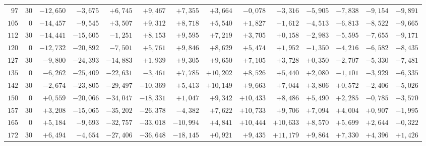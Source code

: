 \begin{landscape}
\begin{longtable}{@{}rr|r|r|r|r|r|r|r|r|r|r|r|r@{}}
\(97\) & \(30\) & \(-12{,}650\) & \(-3{,}675\) & \(+6{,}745\) & \(+9{,}467\) & \(+7{,}355\) & \(+3{,}664\) & \(-0{,}078\) & \(-3{,}316\) & \(-5{,}905\) & \(-7{,}838\) & \(-9{,}154\) & \(-9{,}891\)\\
\(105\) & \(0\) & \(-14{,}457\) & \(-9{,}545\) & \(+3{,}507\) & \(+9{,}312\) & \(+8{,}718\) & \(+5{,}540\) & \(+1{,}827\) & \(-1{,}612\) & \(-4{,}513\) & \(-6{,}813\) & \(-8{,}522\) & \(-9{,}665\)\\
\(112\) & \(30\) & \(-14{,}441\) & \(-15{,}605\) & \(-1{,}251\) & \(+8{,}153\) & \(+9{,}595\) & \(+7{,}219\) & \(+3{,}705\) & \(+0{,}158\) & \(-2{,}983\) & \(-5{,}595\) & \(-7{,}655\) & \(-9{,}171\)\\[2pt]
\(120\) & \(0\) & \(-12{,}732\) & \(-20{,}892\) & \(-7{,}501\) & \(+5{,}761\) & \(+9{,}846\) & \(+8{,}629\) & \(+5{,}474\) & \(+1{,}952\) & \(-1{,}350\) & \(-4{,}216\) & \(-6{,}582\) & \(-8{,}435\)\\
\(127\) & \(30\) & \(-9{,}800\) & \(-24{,}393\) & \(-14{,}883\) & \(+1{,}939\) & \(+9{,}305\) & \(+9{,}650\) & \(+7{,}105\) & \(+3{,}728\) & \(+0{,}350\) & \(-2{,}707\) & \(-5{,}330\) & \(-7{,}481\)\\
\(135\) & \(0\) & \(-6{,}262\) & \(-25{,}409\) & \(-22{,}631\) & \(-3{,}461\) & \(+7{,}785\) & \(+10{,}202\) & \(+8{,}526\) & \(+5{,}440\) & \(+2{,}080\) & \(-1{,}101\) & \(-3{,}929\) & \(-6{,}335\)\\
\(142\) & \(30\) & \(-2{,}674\) & \(-23{,}805\) & \(-29{,}497\) & \(-10{,}369\) & \(+5{,}413\) & \(+10{,}149\) & \(+9{,}663\) & \(+7{,}044\) & \(+3{,}806\) & \(+0{,}572\) & \(-2{,}406\) & \(-5{,}026\)\\[2pt]
\(150\) & \(0\) & \(+0{,}559\) & \(-20{,}066\) & \(-34{,}047\) & \(-18{,}331\) & \(+1{,}047\) & \(+9{,}342\) & \(+10{,}433\) & \(+8{,}486\) & \(+5{,}490\) & \(+2{,}285\) & \(-0{,}785\) & \(-3{,}570\)\\
\(157\) & \(30\) & \(+3{,}208\) & \(-15{,}065\) & \(-35{,}202\) & \(-26{,}378\) & \(-4{,}382\) & \(+7{,}622\) & \(+10{,}733\) & \(+9{,}706\) & \(+7{,}094\) & \(+4{,}004\) & \(+0{,}907\) & \(-1{,}995\)\\
\(165\) & \(0\) & \(+5{,}184\) & \(-9{,}693\) & \(-32{,}757\) & \(-33{,}018\) & \(-10{,}994\) & \(+4{,}841\) & \(+10{,}444\) & \(+10{,}633\) & \(+8{,}570\) & \(+5{,}699\) & \(+2{,}644\) & \(-0{,}322\)\\
\(172\) & \(30\) & \(+6{,}494\) & \(-4{,}654\) & \(-27{,}406\) & \(-36{,}648\) & \(-18{,}145\) & \(+0{,}921\) & \(+9{,}435\) & \(+11{,}179\) & \(+9{,}864\) & \(+7{,}330\) & \(+4{,}396\) & \(+1{,}426\)\\[2pt]

\end{longtable}
\end{landscape}
